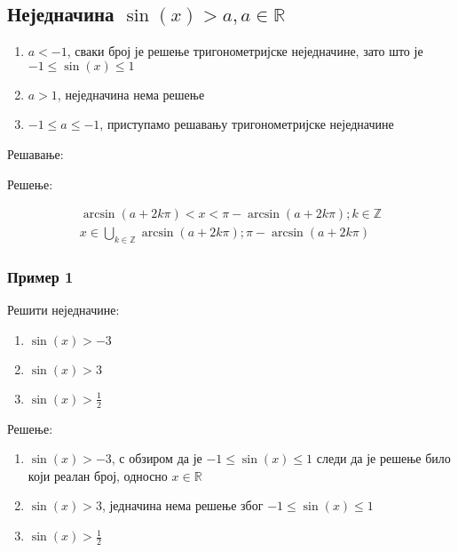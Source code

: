 \documentclass[../diplomski.tex]{subfiles}
\begin{document}
\subsection{Неједначина $\sin(x)>a,a\in\mathbb{R}$}

\begin{enumerate}[label=\alph*)]
\item $a<-1$, сваки број је решење тригонометријске неједначине, зато што је $-1\leq\sin(x)\leq1$
\item $a>1$, неједначина нема решење
\item $-1\leq a\leq-1$, приступамо решавању тригонометријске неједначине
\end{enumerate}

Решавање:




Решење:

\begin{equation}
\begin{split}
\arcsin(a+2k\pi)<x<\pi-\arcsin(a+2k\pi);k\in\mathbb{Z}\\
x\in\bigcup\limits_{k\in\mathbb{Z}}\arcsin(a+2k\pi);\pi-\arcsin(a+2k\pi)	
\end{split}
\end{equation}


\subsubsection{Пример 1}

Решити неједначине:

\begin{enumerate}[label=\alph*)]
\item $\sin(x)>-3$
\item $\sin(x)>3$
\item $\sin(x)>\frac{1}{2}$
\end{enumerate}

Решење:

\begin{enumerate}[label=\alph*)]
\item $\sin(x)>-3$, с обзиром да је $-1\le\sin(x)\le1$ следи да је решење било који реалан број, односно  $x\in\mathbb{R}$
\item $\sin(x)>3$, једначина нема решење због $-1\le\sin(x)\le1$
\item $\sin(x)>\frac{1}{2}$
\end{enumerate}
\end{document}
